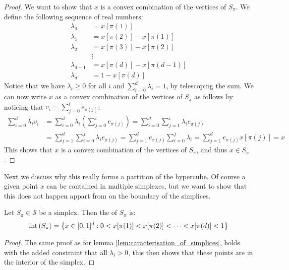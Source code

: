 \begin{proof}
	We want to show that $x$ is a convex combination of the vertices of $S_{\pi}$. We define the following sequence of real numbers:
	\begin{align*}
		\lambda_0     & = x[\pi(1)]               \\
		\lambda_1     & = x[\pi(2)] - x[\pi(1)]   \\
		\lambda_2     & = x[\pi(3)] - x[\pi(2)]   \\
		              & \vdots                    \\
		\lambda_{d-1} & = x[\pi(d)] - x[\pi(d-1)] \\
		\lambda_d     & = 1 - x[\pi(d)]
	\end{align*}
	Notice that we have $\lambda_i \geq 0$ for all $i$ and $\sum_{i=0}^{d} \lambda_i = 1$, by telescoping the sum. We can now write $x$ as a convex combination of the vertices of $S_{\pi}$ as follows by noticing that $v_i = \sum_{j=0}^{i} e_{\pi(j)}$:
	\begin{align*}
		\sum_{i=0}^{d} \lambda_i v_i & = \sum_{i=0}^{d} \lambda_i \left( \sum_{j=0}^{i} e_{\pi(j)} \right)  = \sum_{i=0}^{d} \sum_{j=1}^{i} \lambda_i e_{\pi(j)}                                \\
		                             & = \sum_{j=1}^{d} \sum_{i=0}^{j} \lambda_i e_{\pi(j)}  = \sum_{j=1}^{d} e_{\pi(j)} \sum_{i=0}^{j} \lambda_i		 = \sum_{j=1}^{d} e_{\pi(j)} x[\pi(j)]		     = x
	\end{align*}
	This shows that $x$ is a convex combination of the vertices of $S_{\pi}$, and thus $x \in S_{\pi}$.
\end{proof}
Next we discuss why this really forms a partition of the hypercube. Of course a given point $x$ can be contained in multiple simplexes, but we want to show that this does not happen appart from on the boundary of the simplices.
\begin{lemma}
	Let $S_{\pi} \in \mathcal{S}$ be a simplex. Then the  of $S_{\pi}$ is:
	\begin{align*}
		\text{int}\left(S_{\pi}\right) = \left\{x \in [0, 1]^d : 0 < x[\pi(1)] < x[\pi(2)] < \dots < x[\pi(d)] < 1\right\}
	\end{align*}
\end{lemma}
\begin{proof}
	The same proof as for lemma \ref{lem:caracterisation_of_simplices}, holds with the added constraint that all $\lambda_i > 0$, this then shows that these points are in the interior of the simplex.
\end{proof}
